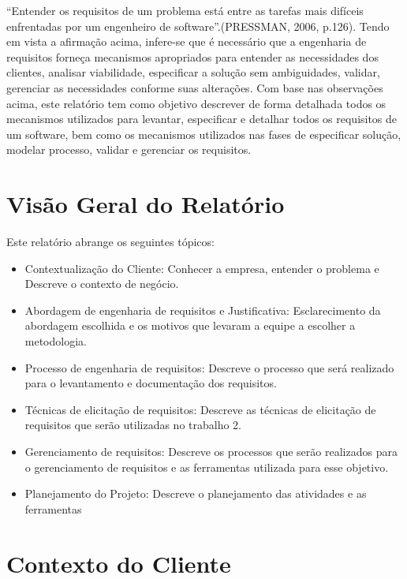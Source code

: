 “Entender os requisitos de um problema está entre as tarefas mais difíceis enfrentadas por um engenheiro de software”.(PRESSMAN, 2006, p.126).
Tendo em vista a afirmação acima, infere-se que é necessário que a engenharia de requisitos forneça mecanismos apropriados para entender as necessidades dos clientes, analisar viabilidade, especificar a solução sem ambiguidades, validar, gerenciar as necessidades conforme suas alterações.
Com base nas observações acima, este relatório tem como objetivo descrever de forma detalhada todos os mecanismos utilizados para levantar, especificar e detalhar todos os requisitos de um software, bem como os mecanismos utilizados nas fases de especificar solução, modelar processo, validar e gerenciar os requisitos.


\section {Visão Geral do Relatório}

Este relatório abrange os seguintes tópicos:

\begin{itemize}
\item Contextualização do Cliente: Conhecer a empresa, entender o problema e Descreve o contexto de negócio.
\item Abordagem de engenharia de requisitos e Justificativa: Esclarecimento da abordagem escolhida e os motivos que levaram a equipe a escolher a metodologia.
\item Processo de engenharia de requisitos: Descreve o processo que será realizado para o levantamento e documentação dos requisitos.
\item Técnicas de elicitação de requisitos: Descreve as técnicas de elicitação de requisitos que serão utilizadas no trabalho 2.
\item Gerenciamento de requisitos: Descreve os processos que serão realizados para o gerenciamento de requisitos e as ferramentas utilizada para esse objetivo.
\item Planejamento do Projeto: Descreve o planejamento das atividades e as ferramentas
\end{itemize}

\section {Contexto do Cliente}

